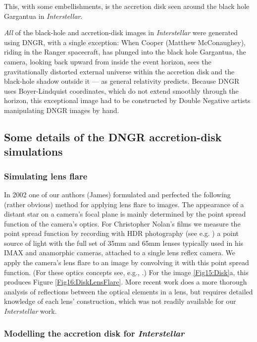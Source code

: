 \documentclass[12pt]{iopart}
\begin{document}
 
 This, with some embellishments, is the accretion disk seen around the black hole
 Gargantua in \emph{Interstellar}.  

\emph{All} of the black-hole and accretion-disk images in \emph{Interstellar} were generated using DNGR, with a single exception:  When Cooper (Matthew McConaughey), riding in the Ranger spacecraft, has plunged into the black hole Gargantua, the camera, looking back upward from inside the event horizon, sees the gravitationally distorted external universe within the accretion disk and the black-hole shadow outside it --- as general relativity predicts.  Because DNGR uses Boyer-Lindquist coordinates, which do not extend smoothly through the horizon, this exceptional image had to be constructed by Double Negative artists manipulating DNGR images by hand.  
 
 
  \subsection{Some details of the DNGR accretion-disk simulations}
 \label{subsec:DNGRdisks}
 
 
 \subsubsection{Simulating lens flare}
 \label{subsec:DNGRFlare}
 
In 2002 one of our authors (James)  formulated and perfected the following (rather obvious) method for applying
lens flare to images.
The appearance of a distant star on a camera's focal plane is mainly determined by the point spread function of the camera's optics. For Christopher Nolan's films we measure the point spread function by recording with HDR photography (see e.g. \cite{REINHARD05}) a point source of light with the full set of 35mm and 65mm lenses
 typically used in his IMAX and anamorphic cameras, attached to a single lens reflex camera.
We apply the camera's lens flare to an image by
 convolving it with this point spread function.  (For these optics concepts
 see, e.g., \cite{BROOKERG}.) For the image \ref{Fig15:Disk}a, this
 produces Figure \ref{Fig16:DiskLensFlare}. More recent work \cite{HULLIN} does a more thorough analysis of reflections
between the optical elements in a lens, but requires detailed knowledge of each lens' construction, which was not
readily available 
for our \emph{Interstellar} work.
 
 \subsubsection{Modelling the accretion disk for \emph{Interstellar}}
 \label{subsec:DNGRInterstellarDisk}
 
\end{document}
